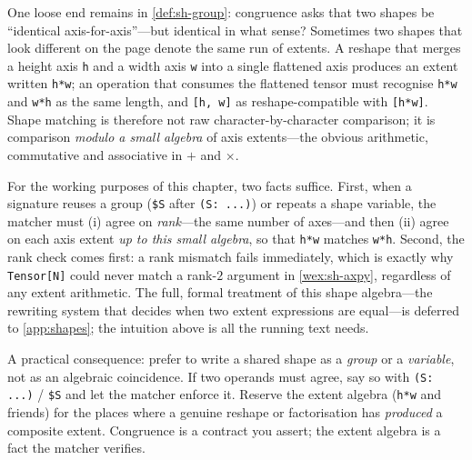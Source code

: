 One loose end remains in \cref{def:sh-group}: congruence asks that two shapes
be ``identical axis-for-axis''---but identical in what sense? Sometimes two
shapes that look different on the page denote the same run of extents. A
reshape that merges a height axis \texttt{h} and a width axis \texttt{w} into a
single flattened axis produces an extent written \lstinline[style=l4style]|h*w|;
an operation that consumes the flattened tensor must recognise
\lstinline[style=l4style]|h*w| and \lstinline[style=l4style]|w*h| as the same
length, and \lstinline[style=l4style]|[h, w]| as reshape-compatible with
\lstinline[style=l4style]|[h*w]|. Shape matching is therefore not raw
character-by-character comparison; it is comparison \emph{modulo a small
algebra} of axis extents---the obvious arithmetic, commutative and associative
in $+$ and $\times$.

For the working purposes of this chapter, two facts suffice. First, when a
signature reuses a group (\lstinline[style=l4style]|$S| after
\lstinline[style=l4style]|(S: ...)|) or repeats a shape variable, the matcher
must (i) agree on \emph{rank}---the same number of axes---and then (ii) agree
on each axis extent \emph{up to this small algebra}, so that
\lstinline[style=l4style]|h*w| matches \lstinline[style=l4style]|w*h|. Second,
the rank check comes first: a rank mismatch fails immediately, which is exactly
why \lstinline[style=l4style]|Tensor[N]| could never match a rank-$2$ argument
in \cref{wex:sh-axpy}, regardless of any extent arithmetic. The full,
formal treatment of this shape algebra---the rewriting system that decides when
two extent expressions are equal---is deferred to \cref{app:shapes}; the
intuition above is all the running text needs.

\begin{notationbox}
A practical consequence: prefer to write a shared shape as a \emph{group} or a
\emph{variable}, not as an algebraic coincidence. If two operands must agree,
say so with \lstinline[style=l4style]|(S: ...)| / \lstinline[style=l4style]|$S|
and let the matcher enforce it. Reserve the extent algebra
(\lstinline[style=l4style]|h*w| and friends) for the places where a genuine
reshape or factorisation has \emph{produced} a composite extent. Congruence is
a contract you assert; the extent algebra is a fact the matcher verifies.
\end{notationbox}


